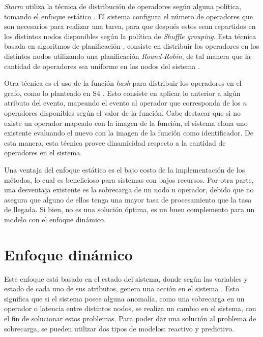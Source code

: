 \textsl{Storm} utiliza la técnica de distribución de operadores según alguna política, tomando el enfoque estático \cite{stormtwitter}. El sistema configura el número de operadores que son necesarios para realizar una tarea, para que después estos sean repartidos en los distintos nodos disponibles según la política de \textit{Shuffle grouping}. Esta técnica basada en algoritmos de planificación \cite{bookScheduling}, consiste en distribuir los operadores en los distintos nodos utilizando una planificación \textsl{Round-Robin}, de tal manera que la cantidad de operadores sea uniforme en los nodos del sistema \cite{bookstorm}.

Otra técnica es el uso de la función \textsl{hash} \cite{RogawayS04} para distribuir los operadores en el grafo, como lo planteado en S4 \cite{s4yahoo}. Esto consiste en aplicar lo anterior a algún atributo del evento, mapeando el evento al operador que corresponda de los $n$ operadores disponibles según el valor de la función. Cabe destacar que si no existe un operador mapeado con la imagen de la función, el sistema clona uno existente evaluando el nuevo con la imagen de la función como identificador. De esta manera, esta técnica provee dinamicidad respecto a la cantidad de operadores en el sistema.

Una ventaja del enfoque estático es el bajo costo de la implementación de los métodos, lo cual es beneficioso para sistemas con bajos recursos. Por otra parte, una desventaja existente es la sobrecarga de un nodo u operador, debido que no asegura que alguno de ellos tenga una mayor tasa de procesamiento que la tasa de llegada. Si bien, no es una solución óptima, es un buen complemento para un modelo con el enfoque dinámico.

\section{Enfoque dinámico}

Este enfoque está basado en el estado del sistema, donde según las variables y estado de cada uno de sus atributos, genera una acción en el sistema \cite{CasavantK88}. Esto significa que si el sistema posee alguna anomalía, como una sobrecarga en un operador o latencia entre distintos nodos, se realiza un cambio en el sistema, con el fin de solucionar estos problemas. Para poder dar una solución al problema de sobrecarga, se pueden utilizar dos tipos de modelos: reactivo y predictivo.

